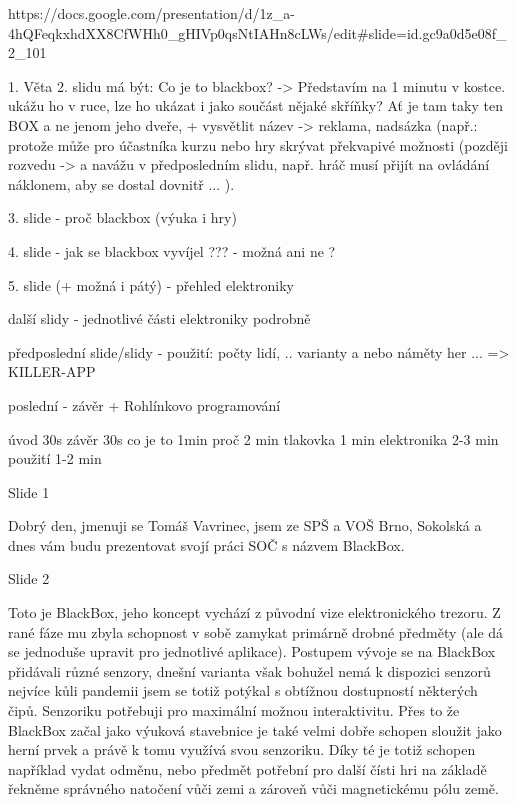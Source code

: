 https://docs.google.com/presentation/d/1z_a-4hQFeqkxhdXX8CfWHh0_gHIVp0qsNtIAHn8cLWs/edit#slide=id.gc9a0d5e08f_2_101

1. Věta 2. slidu má být: Co je to blackbox? -> Představím na 1 minutu v kostce.  
ukážu ho v ruce, lze ho ukázat i jako součást nějaké skříňky? Ať je tam taky ten BOX  
a ne jenom jeho dveře, 
+ vysvětlit název -> reklama, nadsázka (např.: protože může pro účastníka kurzu nebo 
hry skrývat překvapivé možnosti (později rozvedu -> a navážu v předposledním slidu, 
např. hráč musí přijít na ovládání náklonem, aby se dostal dovnitř ... ).


3. slide - proč blackbox (výuka i hry)

4. slide - jak se blackbox vyvíjel ??? - možná ani ne ? 

5. slide (+ možná i pátý) - přehled elektroniky 

další slidy - jednotlivé části elektroniky podrobně 


předposlední slide/slidy - použití: počty lidí, .. varianty a nebo náměty her ... => KILLER-APP

poslední - závěr + Rohlínkovo programování  

úvod 30s závěr 30s 
co je to 1min 
proč 2 min 
tlakovka 1 min 
elektronika 2-3 min 
použití 1-2 min 


Slide 1

Dobrý den, jmenuji se Tomáš Vavrinec, jsem ze SPŠ a VOŠ Brno, Sokolská
a dnes vám budu prezentovat svojí práci SOČ s názvem BlackBox.



Slide 2

Toto je BlackBox, jeho koncept vychází z původní vize elektronického trezoru.
Z rané fáze mu zbyla schopnost v sobě zamykat primárně drobné předměty (ale dá se jednoduše upravit pro jednotlivé aplikace).
Postupem vývoje se na BlackBox přidávali různé senzory, dnešní varianta však bohužel nemá k dispozici senzorů nejvíce kůli 
pandemii jsem se totiž potýkal s obtížnou dostupností některých čipů. 
Senzoriku potřebuji pro maximální možnou interaktivitu. Přes to že BlackBox začal jako výuková stavebnice je také velmi dobře 
schopen sloužit jako herní prvek a právě k tomu využívá svou senzoriku. Díky té je totiž schopen například vydat odměnu, nebo
předmět potřební pro další čísti hri na základě řekněme správného natočení vůči zemi a zároveň vůči magnetickému pólu země.

